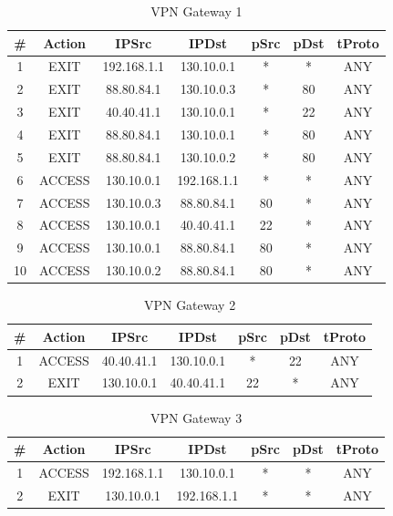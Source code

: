 \begin{table}[H]
    \centering
    \begin{tabular}{ccccccc}
        \hline
         \# & Action & IPSrc & IPDst & pSrc & pDst & tProto \\
        \hline
        1 & EXIT & 192.168.1.1 & 130.10.0.1 & * & * & ANY \\
        2 & EXIT & 88.80.84.1 & 130.10.0.3 & * & 80 & ANY \\
        3 & EXIT & 40.40.41.1 & 130.10.0.1 & * & 22 & ANY \\
        4 & EXIT & 88.80.84.1 & 130.10.0.1 & * & 80 & ANY \\
        5 & EXIT & 88.80.84.1 & 130.10.0.2 & * & 80 & ANY \\
        6 & ACCESS & 130.10.0.1 & 192.168.1.1 & * & * & ANY \\
        7 & ACCESS & 130.10.0.3 & 88.80.84.1 & 80 & * & ANY \\
        8 & ACCESS & 130.10.0.1 & 40.40.41.1 & 22 & * & ANY \\
        9 & ACCESS & 130.10.0.1 & 88.80.84.1 & 80 & * & ANY \\
        10 & ACCESS & 130.10.0.2 & 88.80.84.1 & 80 & * & ANY\\
        \hline
    \end{tabular}
    \caption{VPN Gateway 1}
    \label{tab:VPN Gateway 1}
\end{table}

\begin{table}[H]
    \centering
    \begin{tabular}{ccccccc}
        \hline
         \# & Action & IPSrc & IPDst & pSrc & pDst & tProto \\
        \hline
        1 & ACCESS & 40.40.41.1 & 130.10.0.1 & * & 22 & ANY \\
        2 & EXIT & 130.10.0.1 & 40.40.41.1 & 22 & * & ANY \\
        \hline
    \end{tabular}
    \caption{VPN Gateway 2}
    \label{tab:VPN Gateway 2}
\end{table}

\begin{table}[H]
    \centering
    \begin{tabular}{ccccccc}
        \hline
         \# & Action & IPSrc & IPDst & pSrc & pDst & tProto \\
        \hline
        1 & ACCESS & 192.168.1.1 & 130.10.0.1 & * & * & ANY \\
        2 & EXIT & 130.10.0.1 & 192.168.1.1 & * & * & ANY \\
        \hline
    \end{tabular}
    \caption{VPN Gateway 3}
    \label{tab:VPN Gateway 3}
\end{table}


